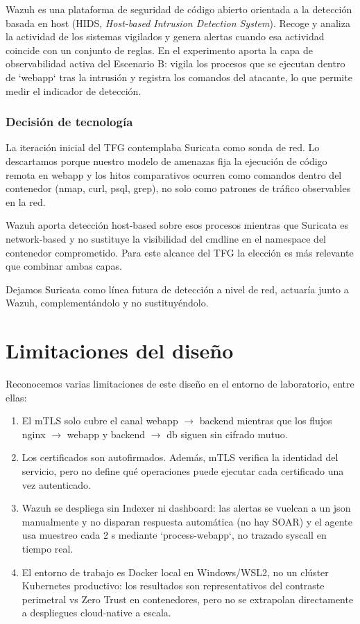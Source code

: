 \documentclass[11pt,spanish,listoffigures,listoftables]{tfgetsinf}
\begin{document}
    Wazuh es una plataforma de seguridad de código abierto orientada a la detección basada en host (HIDS, \textit{Host-based Intrusion Detection System}). Recoge y analiza la actividad de los sistemas vigilados y genera alertas cuando esa actividad coincide con un conjunto de reglas. En el experimento aporta la capa de observabilidad activa del Escenario B: vigila los procesos que se ejecutan dentro de `webapp` tras la intrusión y registra los comandos del atacante, lo que permite medir el indicador de detección.

        \subsubsection{Decisión de tecnología}
        La iteración inicial del TFG contemplaba Suricata como sonda de red. Lo descartamos porque nuestro modelo de amenazas fija la ejecución de código remota en webapp y los hitos comparativos ocurren como comandos dentro del contenedor (nmap, curl, psql, grep), no solo como patrones de tráfico observables en la red.

        Wazuh aporta detección host-based sobre esos procesos mientras que Suricata es network-based y no sustituye la visibilidad del cmdline en el namespace del contenedor comprometido. Para este alcance del TFG la elección es más relevante que combinar ambas capas. 
        
        Dejamos Suricata como línea futura de detección a nivel de red, actuaría junto a Wazuh, complementándolo y no sustituyéndolo.
    
    \section{Limitaciones del diseño}
    \label{sec:4.5}


    Reconocemos varias limitaciones de este diseño en el entorno de laboratorio, entre ellas:

    \begin{enumerate}
        \item El mTLS solo cubre el canal webapp $\rightarrow$ backend mientras que los flujos nginx $\rightarrow$ webapp y backend $\rightarrow$ db siguen sin cifrado mutuo.
        \item Los certificados son autofirmados. Además, mTLS verifica la identidad del servicio, pero no define qué operaciones puede ejecutar cada certificado una vez autenticado.
        \item Wazuh se despliega sin Indexer ni dashboard: las alertas se vuelcan a un json manualmente y no disparan respuesta automática (no hay SOAR) y el agente usa muestreo cada 2 s mediante `process-webapp`, no trazado syscall en tiempo real.
        \item El entorno de trabajo es Docker local en Windows/WSL2, no un clúster Kubernetes productivo: los resultados son representativos del contraste perimetral vs Zero Trust en contenedores, pero no se extrapolan directamente a despliegues cloud-native a escala.
    \end{enumerate}
\end{document}
